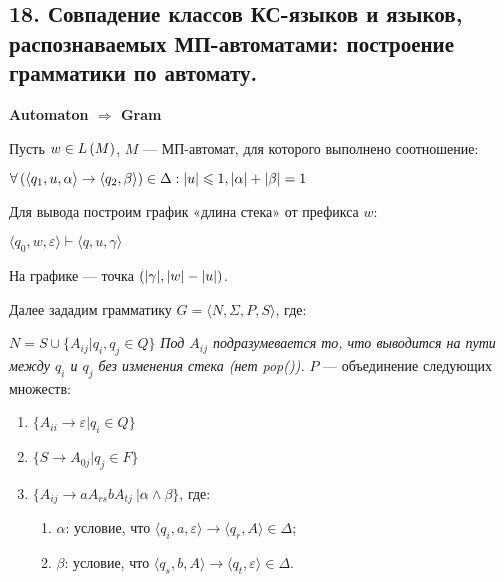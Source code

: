 \subsection{18. Совпадение классов КС-языков и языков, распознаваемых МП-автоматами: построение грамматики по автомату.}
\textbf{Automaton $\Longrightarrow$ Gram}

\Proof Пусть $w \in L \left({M}\right)$, $M$ — МП-автомат, для которого выполнено соотношение:

\begin{center}
    $\forall \left({\langle q_1, u, \alpha \rangle \rightarrow \langle q_2, \beta \rangle}\right) \in \Delta : |u| \leqslant 1, |\alpha| + |\beta| = 1$
\end{center}

Для вывода построим график «длина стека» от префикса $w$:

\begin{center}
    $\langle q_0, w, \varepsilon \rangle \vdash \langle q, u, \gamma \rangle$
\end{center}

На графике — точка $\left({|\gamma|, |w| - |u|}\right)$.


Далее зададим грамматику $G = \langle N, \Sigma, P, S \rangle$, где:

\begin{center}
    $N = S \cup \{ A_{ij} | q_i, q_j \in Q \}$
    \textit{Под $A_{ij}$ подразумевается то, что выводится на пути между $q_i$ и $q_j$ без изменения стека (нет pop()).}
    $P$ — объединение следующих множеств:
    \begin{enumerate}
        \item $\{ A_{ii} \rightarrow \varepsilon | q_i \in Q \}$
        \item $\{ S \rightarrow A_{0j} | q_j \in F \}$
        \item $\{A_{ij} \rightarrow aA_{rs}bA_{tj}\ | \alpha \wedge \beta\}$, где:
        \begin{enumerate}
            \item $\alpha$: условие, что $\langle q_i, a, \varepsilon \rangle \rightarrow \langle q_r, A \rangle \in \Delta$;
            \item $\beta$: условие, что $\langle q_s, b, A \rangle \rightarrow \langle q_t, \varepsilon \rangle \in \Delta$.
        \end{enumerate}
    \end{enumerate}
\end{center}

